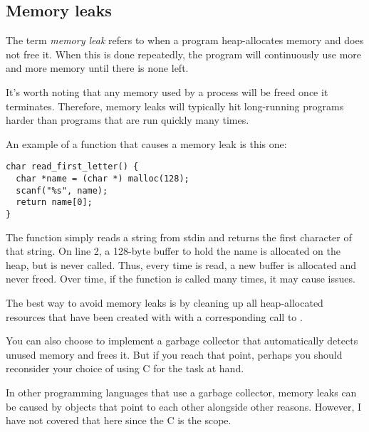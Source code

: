 \subsection{Memory leaks}

The term \textit{memory leak} refers to when a program heap-allocates memory and does not free it. When this is done repeatedly, the program will continuously use more and more memory until there is none left.

It's worth noting that any memory used by a process will be freed once it terminates. Therefore, memory leaks will typically hit long-running programs harder than programs that are run quickly many times.

An example of a function that causes a memory leak is this one:

\begin{verbatim}
char read_first_letter() {
  char *name = (char *) malloc(128);
  scanf("%s", name);
  return name[0];
}
\end{verbatim}

The function simply reads a string from stdin and returns the first character of that string. On line 2, a 128-byte buffer to hold the name is allocated on the heap, but  is never called. Thus, every time  is read, a new buffer is allocated and never freed. Over time, if the function is called many times, it may cause issues.

The best way to avoid memory leaks is by cleaning up all heap-allocated resources that have been created with  with a corresponding call to .

You can also choose to implement a garbage collector that automatically detects unused memory and frees it. But if you reach that point, perhaps you should reconsider your choice of using C for the task at hand.

In other programming languages that use a garbage collector, memory leaks can be caused by objects that point to each other alongside other reasons. However, I have not covered that here since the C is the scope.
